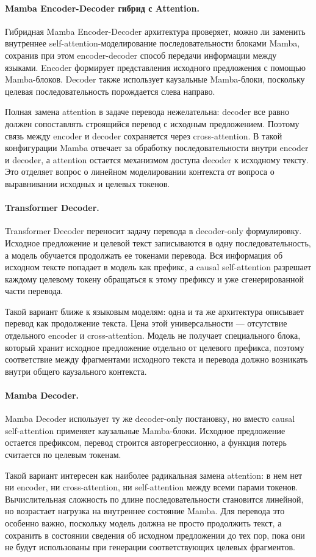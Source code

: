 \paragraph{Mamba Encoder-Decoder гибрид с Attention.}
Гибридная Mamba Encoder-Decoder архитектура проверяет, можно ли заменить внутреннее self-attention-моделирование последовательности блоками Mamba, сохранив при этом encoder-decoder способ передачи информации между языками. Encoder формирует представления исходного предложения с помощью Mamba-блоков. Decoder также использует каузальные Mamba-блоки, поскольку целевая последовательность порождается слева направо.

Полная замена attention в задаче перевода нежелательна: decoder все равно должен сопоставлять строящийся перевод с исходным предложением. Поэтому связь между encoder и decoder сохраняется через cross-attention. В такой конфигурации Mamba отвечает за обработку последовательности внутри encoder и decoder, а attention остается механизмом доступа decoder к исходному тексту. Это отделяет вопрос о линейном моделировании контекста от вопроса о выравнивании исходных и целевых токенов.

\paragraph{Transformer Decoder.}
Transformer Decoder переносит задачу перевода в decoder-only формулировку. Исходное предложение и целевой текст записываются в одну последовательность, а модель обучается продолжать ее токенами перевода. Вся информация об исходном тексте попадает в модель как префикс, а causal self-attention разрешает каждому целевому токену обращаться к этому префиксу и уже сгенерированной части перевода.

Такой вариант ближе к языковым моделям: одна и та же архитектура описывает перевод как продолжение текста. Цена этой универсальности --- отсутствие отдельного encoder и cross-attention. Модель не получает специального блока, который хранит исходное предложение отдельно от целевого префикса, поэтому соответствие между фрагментами исходного текста и перевода должно возникать внутри общего каузального контекста.

\paragraph{Mamba Decoder.}
Mamba Decoder использует ту же decoder-only постановку, но вместо causal self-attention применяет каузальные Mamba-блоки. Исходное предложение остается префиксом, перевод строится авторегрессионно, а функция потерь считается по целевым токенам.

Такой вариант интересен как наиболее радикальная замена attention: в нем нет ни encoder, ни cross-attention, ни self-attention между всеми парами токенов. Вычислительная сложность по длине последовательности становится линейной, но возрастает нагрузка на внутреннее состояние Mamba. Для перевода это особенно важно, поскольку модель должна не просто продолжить текст, а сохранить в состоянии сведения об исходном предложении до тех пор, пока они не будут использованы при генерации соответствующих целевых фрагментов.

